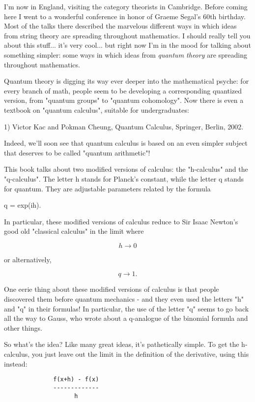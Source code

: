 

I'm now in England, visiting the category theorists in Cambridge.
Before coming here I went to a wonderful conference in honor of
Graeme Segal's 60th birthday.  Most of the talks there described 
the marvelous different ways in which ideas from string theory
are spreading throughout mathematics.  I should really tell you
about this stuff... it's very cool... but right now I'm in the
mood for talking about something simpler: some ways in which ideas
from \emph{quantum theory} are spreading throughout mathematics.

Quantum theory is digging its way ever deeper into the mathematical
psyche: for every branch of math, people seem to be developing a
corresponding quantized version, from "quantum groups" to
"quantum cohomology".  Now there is even a textbook on
"quantum calculus", suitable for undergraduates:

1) Victor Kac and Pokman Cheung, Quantum Calculus, Springer, Berlin, 2002.

Indeed, we'll soon see that quantum calculus is based on an even simpler
subject that deserves to be called "quantum arithmetic"!


This book talks about two modified versions of calculus: the
"h-calculus" and the "q-calculus".  The letter h
stands for Planck's constant, while the letter q stands for
quantum. They are adjustable parameters related by the formula

q = exp(ih).

In particular, these modified versions of calculus reduce to
Sir Isaac Newton's good old "classical calculus" in the limit where

$$
h \to  0
$$
    
or alternatively,

$$
q \to  1.
$$
    
One eerie thing about these modified versions of calculus is that people
discovered them before quantum mechanics - and they even used the
letters "h" and "q" in their formulas!  In
particular, the use of the letter "q" seems to go back all the
way to Gauss, who wrote about a q-analogue of the binomial formula and
other things.

So what's the idea?   Like many great ideas, it's pathetically simple. 
To get the h-calculus, you just leave out the limit in the definition of
the derivative, using this instead:

\begin{verbatim}
              f(x+h) - f(x)
              -------------
                    h
\end{verbatim}
    
